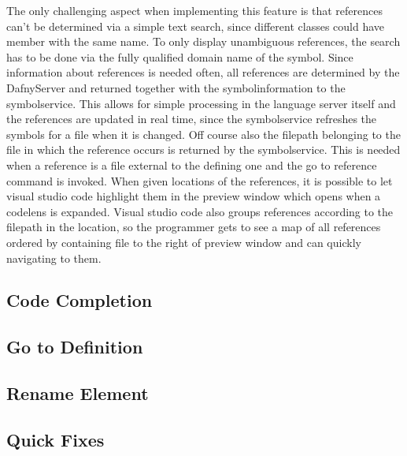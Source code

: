 The only challenging aspect when implementing this feature is that references can't be determined via a simple text search, since different classes could have member with the same name. To only display unambiguous references, the search has to be done via the fully qualified domain name of the symbol. Since information about references is needed often, all references are determined by the DafnyServer and returned together with the symbolinformation to the symbolservice. This allows for simple processing in the language server itself and the references are updated in real time, since the symbolservice refreshes the symbols for a file when it is changed. Off course also the filepath belonging to the file in which the reference occurs is returned by the symbolservice. This is needed when a reference is a file external to the defining one and the go to reference command is invoked.\newline
When given locations of the references, it is possible to let visual studio code highlight them in the preview window which opens when a codelens is expanded. Visual studio code also groups references according to the filepath in the location, so the programmer gets to see a map of all references ordered by containing file to the right of preview window and can quickly navigating to them.











 \subsection{Code Completion} \label{codecompletion}
 

\subsection{Go to Definition} \label{gotodefinition}

\subsection{Rename Element} \label{renameelement}

\subsection{Quick Fixes} \label{quickfixes}